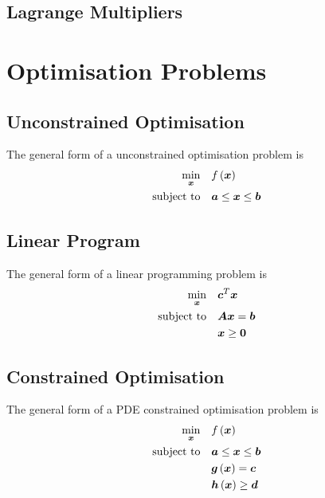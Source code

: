 \subsection{Lagrange Multipliers}

\section{Optimisation Problems}

\subsection{Unconstrained Optimisation}

The general form of a unconstrained optimisation problem is
\begin{equation}
  \begin{aligned}
    \min_{\vect{x}} & & & \fnof{f}{\vect{x}} \\
    \text{subject to} & & & \vect{a}\le\vect{x}\le\vect{b}
  \end{aligned}
\end{equation}

\subsection{Linear Program}

The general form of a linear programming problem is
\begin{equation}
  \begin{aligned}
    \min_{\vect{x}} & & & \transpose{\vect{c}}{\vect{x}} \\
    \text{subject to} & & & \matr{A}\vect{x}=\vect{b} \\
    & & & \vect{x}\ge\vect{0}
  \end{aligned}
\end{equation}

\subsection{Constrained Optimisation}

The general form of a PDE constrained optimisation problem is
\begin{equation}
  \begin{aligned}
    \min_{\vect{x}} & & & \fnof{f}{\vect{x}} \\
    \text{subject to} &&& \vect{a}\le\vect{x}\le\vect{b} \\
    & & &\fnof{\vect{g}}{\vect{x}}=\vect{c} \\
    &&& \fnof{\vect{h}}{\vect{x}}\ge\vect{d}
  \end{aligned}
\end{equation}

